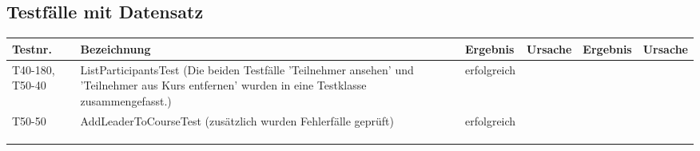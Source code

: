 \begin{landscape}
	\section{Testfälle mit Datensatz}	
		\begin{tabular}{|p{2.0cm} |p{5.0cm}|p{3.0cm}|p{5.0cm}|p{4.0cm}|p{4.0cm}|}
			\hline \textbf{Testnr.} & \textbf{Bezeichnung} & \textbf{Ergebnis} & \textbf{Ursache} & \textbf{Ergebnis} & \textbf{Ursache} \\
			\hline  T40-180, T50-40  & ListParticipantsTest (Die beiden Testfälle 'Teilnehmer ansehen' und 'Teilnehmer aus Kurs entfernen' wurden in eine Testklasse zusammengefasst.) &     erfolgreich     &        &         &       \\
			\hline  T50-50  &  AddLeaderToCourseTest (zusätzlich wurden Fehlerfälle geprüft) &  erfolgreich &        &         &       \\
			\hline       &          &          &        &         &       \\
			\hline       &          &          &        &         &       \\
			\hline       &          &          &        &         &       \\
			\hline 
		\end{tabular} \ \\
		\ \\
	
\end{landscape}